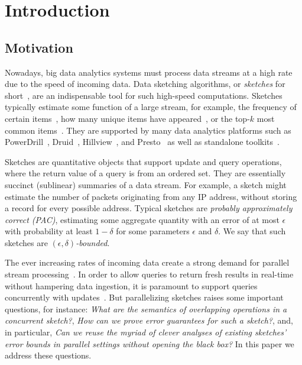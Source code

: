 \section{Introduction}
\label{ivl-sec:intro}

\subsection{Motivation}
\label{ivl-ssec:motivation}

Nowadays, big data analytics systems must process data streams at a high rate due to the speed of incoming data.
Data sketching algorithms, or \emph{sketches} for short~\cite{cormode2012synopses}, are
an indispensable tool for such high-speed computations. Sketches typically estimate some function
of a large stream, for example, the frequency of certain items~\cite{CountMin}, how many unique items
have appeared~\cite{datar2002comparing, flajolet1983probabilistic, gibbons2001estimating},
or the top-$k$ most common items~\cite{metwally2005efficient}.
They are supported by many data analytics platforms such as PowerDrill~\cite{heule2013hyperloglog},
Druid~\cite{druid}, Hillview~\cite{hillview}, and Presto~\cite{presto} as well as standalone toolkits~\cite{apache-datasketches}.

Sketches are quantitative objects that support {\sc update}
and {\sc query} operations, where the return value of a {\sc query}
is from an ordered set. They are essentially succinct (sublinear)
summaries of a data stream. For example, a sketch might estimate the number of packets originating
from any IP address, without storing a record for every possible address.
Typical sketches are \emph{probably approximately correct (PAC)}, estimating some aggregate
quantity with an error of at most $\epsilon$ with probability at least $1-\delta$ for some
parameters $\epsilon$ and $\delta$. We say that such sketches are \emph{$(\epsilon,\delta)$-bounded}.



The ever increasing rates of incoming data create a strong demand for parallel
stream processing~\cite{cormode2011algorithms,heule2013hyperloglog}.
In order to allow queries to return fresh results in real-time without
hampering data ingestion, it is paramount to support queries concurrently with updates~\cite{rinberg2019fast,stylianopoulos2020delegation}.
But parallelizing sketches raises some important questions, for instance: \textit{What are the semantics of overlapping operations in a concurrent sketch?},
\textit{How can we prove error guarantees for such a sketch?}, and, in particular,
\textit{Can we reuse the myriad of clever analyses of existing sketches' error bounds in parallel settings without opening the black box?}
In this paper we address these questions.

